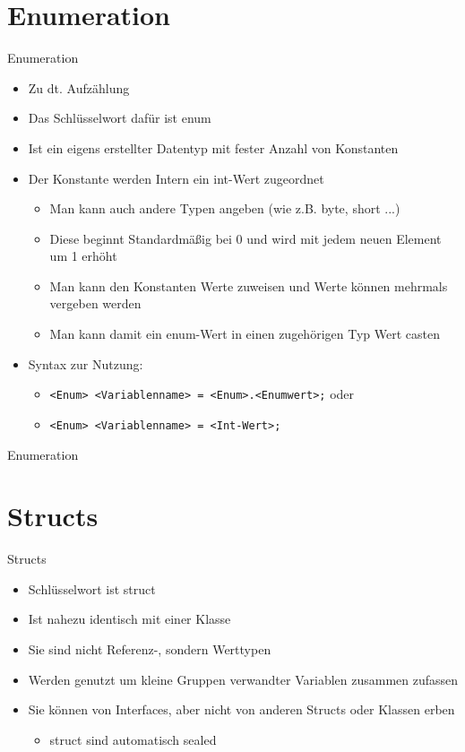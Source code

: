\section{Enumeration}
\begin{frame}{Enumeration}
	\begin{itemize}
		\item Zu dt. Aufzählung
		\item Das Schlüsselwort dafür ist \alert{enum}
		\item Ist ein eigens erstellter Datentyp mit fester Anzahl von Konstanten
		\item Der Konstante werden Intern ein \alert{int}-Wert zugeordnet
		\begin{itemize}
			\item Man kann auch andere Typen angeben (wie z.B. \alert{byte}, \alert{short} ...)
			\item Diese beginnt Standardmäßig bei 0 und wird mit jedem neuen Element um 1 erhöht
			\item Man kann den Konstanten Werte zuweisen und Werte können mehrmals vergeben werden
			\item Man kann damit ein \alert{enum}-Wert in einen zugehörigen Typ Wert casten			
		\end{itemize}
		\item Syntax zur Nutzung:
		\begin{itemize}
			\item \texttt{\alert{<Enum> <Variablenname>} = \alert{<Enum>}.\alert{<Enumwert>};} oder
			\item \texttt{\alert{<Enum> <Variablenname>} = \alert{<Int-Wert>};}
		\end{itemize}
	\end{itemize}
\end{frame}

\begin{frame}{Enumeration}
	
	
\end{frame}

\section{Structs}
\begin{frame}{Structs}
	\begin{itemize}
		\item Schlüsselwort ist \alert{struct}
		\item Ist nahezu identisch mit einer Klasse
		\item Sie sind nicht Referenz-, sondern Werttypen
		\item Werden genutzt um kleine Gruppen verwandter Variablen zusammen zufassen
		\item Sie können von Interfaces, aber nicht von anderen Structs oder Klassen erben 
		\begin{itemize}
			\item \alert{struct} sind automatisch \alert{sealed}
		\end{itemize}
	\end{itemize}
\end{frame}

